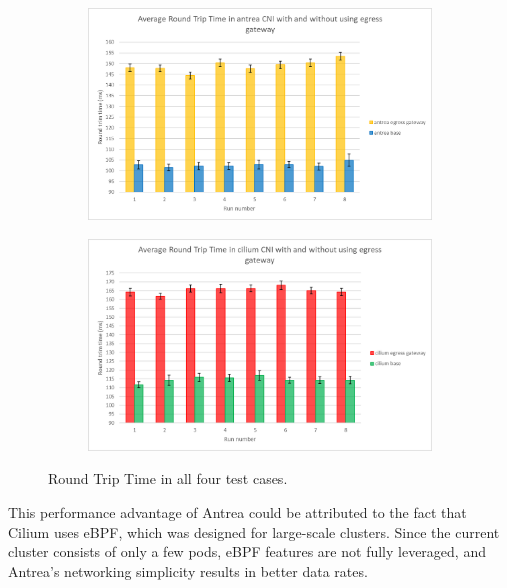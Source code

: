 \begin{figure}[H]
    \begin{subfigure}[b]{0.45\textwidth}
        \includegraphics[width=\textwidth]{plots/small/rtt_antrea.png}
        \caption{}
        \label{fig:rtt_c}
    \end{subfigure}
    \hfill
    \begin{subfigure}[b]{0.45\textwidth}
        \includegraphics[width=\textwidth]{plots/small/rtt_cilium.png}
        \caption{}
        \label{fig:rtt_d}
    \end{subfigure}
    
    \caption{Round Trip Time in all four test cases.}
    \label{fig:rttFour}
\end{figure}

This performance advantage of Antrea could be attributed to the fact that Cilium uses eBPF, which was designed for large-scale clusters. Since the current cluster consists of only a few pods, eBPF features are not fully leveraged, and Antrea's networking simplicity results in better data rates.

